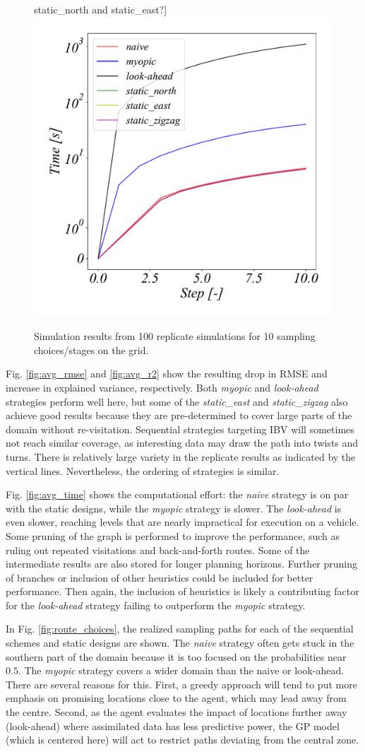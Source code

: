 \begin{figure}[h!]
{    static\_north and static\_east?}]{\label{fig:avg_time}\includegraphics[height=0.49\textwidth]{Figures/sim/avg_Time.pdf}} 
\caption{Simulation results from 100 replicate simulations for 10
  sampling choices/stages on the grid. }  
\label{fig:sim_results}
\end{figure}

Fig. \ref{fig:avg_rmse} and \ref{fig:avg_r2} show the resulting drop
in RMSE and increase in explained variance, respectively. Both
\textit{myopic} and \textit{look-ahead} strategies perform well here,
but some of the \textit{static\_east} and \textit{static\_zigzag} also
achieve good results because they are pre-determined to cover large
parts of the domain without re-visitation. Sequential strategies
targeting IBV will sometimes not reach similar coverage, as
interesting data may draw the path into twists and turns. There is
relatively large variety in the replicate results as indicated by the
vertical lines. Nevertheless, the ordering of strategies is similar.


Fig. \ref{fig:avg_time} shows the computational effort: the
\textit{naive} strategy is on par with the static designs, while the
\textit{myopic} strategy is slower. The \textit{look-ahead} is even
slower, reaching levels that are nearly impractical for execution on a
vehicle. Some pruning of the graph is performed to improve the
performance, such as ruling out repeated visitations and
back-and-forth routes. Some of the intermediate results are also
stored for longer planning horizons. Further pruning of branches or
inclusion of other heuristics could be included for better
performance. Then again, the inclusion of heuristics is likely a
contributing factor for the \textit{look-ahead} strategy failing to
outperform the \textit{myopic} strategy.

In Fig. \ref{fig:route_choices}, the realized sampling paths for each
of the sequential schemes and static designs are shown. The
\textit{naive} strategy often gets stuck in the southern part of the
domain because it is too focused on the probabilities near $0.5$. The
\textit{myopic} strategy covers a wider domain than the naive or
look-ahead. There are several reasons for this. First, a greedy
approach will tend to put more emphasis on promising locations close
to the agent, which may lead away from the centre. Second, as the
agent evaluates the impact of locations further away (look-ahead)
where assimilated data has less predictive power, the GP model (which
is centered here) will act to restrict paths deviating from the
central zone.

